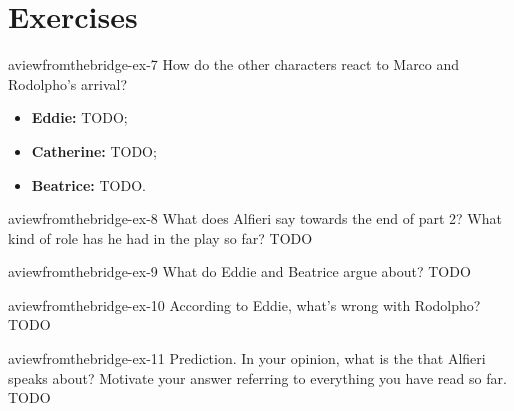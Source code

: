 \documentclass[preview]{standalone}
\begin{document}
\genpage

\section{Exercises}

\begin{snippetexercise}{aviewfromthebridge-ex-7}
{How do the other characters react to Marco and Rodolpho's arrival?}
\begin{itemize}
    \item \textbf{Eddie:} TODO;
    \item \textbf{Catherine:} TODO;
    \item \textbf{Beatrice:} TODO.
\end{itemize}
\end{snippetexercise}

\begin{snippetexercise}{aviewfromthebridge-ex-8}
{What does Alfieri say towards the end of part 2? What kind of role has he had in the play so far?}
TODO
\end{snippetexercise}

\begin{snippetexercise}{aviewfromthebridge-ex-9}
{What do Eddie and Beatrice argue about?}
TODO
\end{snippetexercise}

\begin{snippetexercise}{aviewfromthebridge-ex-10}
{According to Eddie, what's wrong with Rodolpho?}
TODO
\end{snippetexercise}

\begin{snippetexercise}{aviewfromthebridge-ex-11}
{Prediction. In your opinion, what is the  that Alfieri speaks
about? Motivate your answer referring to everything you have read so far.}
TODO
\end{snippetexercise}
\end{document}
